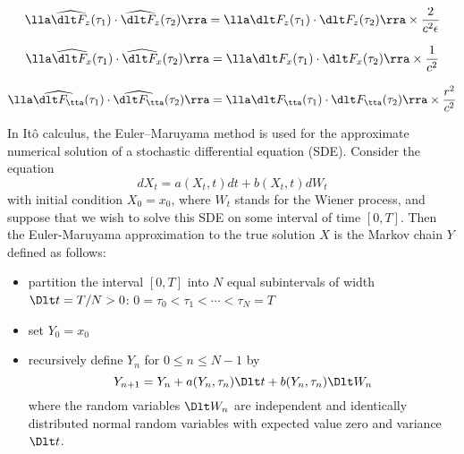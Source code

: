 \documentclass[fleqn,10pt]{InternshipReport_SI-ENS-PSL}
\begin{document}


$$ \lla \widehat{\dlt F_{z}}(\tau_1) \cdot \widehat{\dlt F_{z}}(\tau_2) \rra = \lla \dlt F_{z}(\tau_1) \cdot \dlt F_{z}(\tau_2) \rra \times \frac{2}{c^2 \eps} $$

$$ \lla \widehat{\dlt F_{x}}(\tau_1) \cdot \widehat{\dlt F_{x}}(\tau_2) \rra = \lla \dlt F_{x}(\tau_1) \cdot \dlt F_{x}(\tau_2) \rra \times \frac{1}{c^2} $$

$$ \lla \widehat{\dlt F_{\tta}}(\tau_1) \cdot \widehat{\dlt F_{\tta}}(\tau_2) \rra = \lla \dlt F_{\tta}(\tau_1) \cdot \dlt F_{\tta}(\tau_2) \rra \times \frac{r^2}{c^2} $$




In Itô calculus, the Euler–Maruyama method is used for the approximate numerical solution of a stochastic differential equation (SDE). 
Consider the equation 
$$ dX_t = a(X_t,t) dt + b(X_t,t) dW_t $$
with initial condition $X_0 = x_0$, where $W_t$ stands for the Wiener process, and suppose that we wish to solve this SDE on some interval of time $[0, T]$. Then the Euler-Maruyama approximation to the true solution $X$ is the Markov chain $Y$ defined as follows:
\begin{itemize}[noitemsep]
	\item partition the interval $[0,T]$ into $N$ equal subintervals of width $\Dlt t = T/N > 0$:
	$ 0 = \tau_0 < \tau_1 < \cdots < \tau_N = T $
	\item set $Y_0 = x_0$
	\item recursively define $Y_n$ for $0 \leqslant n \leqslant N-1$ by
	$$ Y_{n+1} = Y_n + a(Y_n,\tau_n) \Dlt t + b(Y_n,\tau_n) \Dlt W_n $$
	where the random variables $\Dlt W_n$ are independent and identically distributed normal random variables with expected value zero and variance $\Dlt t$.
\end{itemize}


\end{document}
